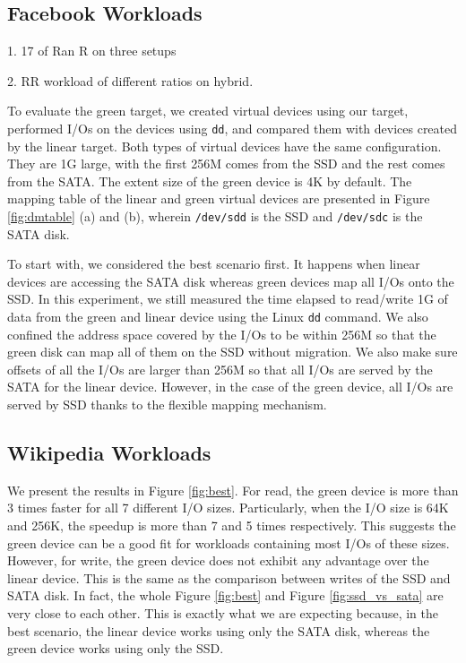 \subsection{Facebook Workloads}

1. 17 of Ran R on three setups

2. RR workload of different ratios on hybrid.

To evaluate the green target, we created virtual devices using our
target, performed I/Os on the devices using \texttt{dd}, and compared
them with devices created by the linear target.  Both types of virtual
devices have the same configuration. They are 1G large, with the first
256M comes from the SSD and the rest comes from the SATA. The extent
size of the green device is 4K by default. The mapping table of the
linear and green virtual devices are presented in Figure
\ref{fig:dmtable} (a) and (b), wherein \texttt{/dev/sdd} is the SSD
and \texttt{/dev/sdc} is the SATA disk. 

To start with, we considered the best scenario first. It happens when
linear devices are accessing the SATA disk whereas green devices map
all I/Os onto the SSD.  In this experiment, we still measured the time
elapsed to read/write 1G of data from the green and linear device
using the Linux \texttt{dd} command.  We also confined the address
space covered by the I/Os to be within 256M so that the green disk can
map all of them on the SSD without migration.  We also make sure
offsets of all the I/Os are larger than 256M so that all I/Os are
served by the SATA for the linear device. However, in the case of the
green device, all I/Os are served by SSD thanks to the flexible
mapping mechanism.  

\subsection{Wikipedia Workloads}

We present the results in Figure \ref{fig:best}.  For read, the green
device is more than 3 times faster for all 7 different I/O sizes.
Particularly, when the I/O size is 64K and 256K, the speedup is more
than 7 and 5 times respectively. This suggests the green device can be
a good fit for workloads containing most I/Os of these sizes. However,
for write, the green device does not exhibit any advantage over the
linear device. This is the same as the comparison between writes of
the SSD and SATA disk. In fact, the whole Figure \ref{fig:best} and
Figure \ref{fig:ssd_vs_sata} are very close to each other. This is
exactly what we are expecting because, in the best scenario, the
linear device works using only the SATA disk, whereas the green device
works using only the SSD.

